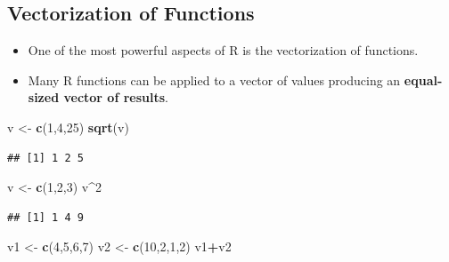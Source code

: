 \documentclass[]{book}
\newenvironment{Shaded}{\begin{snugshade}}{\end{snugshade}}
\newcommand{\DecValTok}[1]{\textcolor[rgb]{0.00,0.00,0.81}{#1}}
\newcommand{\KeywordTok}[1]{\textcolor[rgb]{0.13,0.29,0.53}{\textbf{#1}}}
\newcommand{\NormalTok}[1]{#1}
\newcommand{\OperatorTok}[1]{\textcolor[rgb]{0.81,0.36,0.00}{\textbf{#1}}}
\newcommand{\StringTok}[1]{\textcolor[rgb]{0.31,0.60,0.02}{#1}}
\providecommand{\tightlist}{%
  \setlength{\itemsep}{0pt}\setlength{\parskip}{0pt}}
\begin{document}
\hypertarget{vectorization-of-functions}{%
\subsection{Vectorization of Functions}\label{vectorization-of-functions}}

\begin{itemize}
\tightlist
\item
  One of the most powerful aspects of R is the vectorization of functions.
\item
  Many R functions can be applied to a vector of values producing an \textbf{equal-sized vector of results}.
\end{itemize}

\begin{Shaded}
\begin{Highlighting}[]
\NormalTok{v <-}\StringTok{ }\KeywordTok{c}\NormalTok{(}\DecValTok{1}\NormalTok{,}\DecValTok{4}\NormalTok{,}\DecValTok{25}\NormalTok{)}
\KeywordTok{sqrt}\NormalTok{(v)}
\end{Highlighting}
\end{Shaded}

\begin{verbatim}
## [1] 1 2 5
\end{verbatim}

\begin{Shaded}
\begin{Highlighting}[]
\NormalTok{v <-}\StringTok{ }\KeywordTok{c}\NormalTok{(}\DecValTok{1}\NormalTok{,}\DecValTok{2}\NormalTok{,}\DecValTok{3}\NormalTok{)}
\NormalTok{v}\OperatorTok{^}\DecValTok{2}
\end{Highlighting}
\end{Shaded}

\begin{verbatim}
## [1] 1 4 9
\end{verbatim}

\begin{Shaded}
\begin{Highlighting}[]
\NormalTok{v1 <-}\StringTok{ }\KeywordTok{c}\NormalTok{(}\DecValTok{4}\NormalTok{,}\DecValTok{5}\NormalTok{,}\DecValTok{6}\NormalTok{,}\DecValTok{7}\NormalTok{)}
\NormalTok{v2 <-}\StringTok{ }\KeywordTok{c}\NormalTok{(}\DecValTok{10}\NormalTok{,}\DecValTok{2}\NormalTok{,}\DecValTok{1}\NormalTok{,}\DecValTok{2}\NormalTok{)}
\NormalTok{v1}\OperatorTok{+}\NormalTok{v2}
\end{Highlighting}
\end{Shaded}
\end{document}

